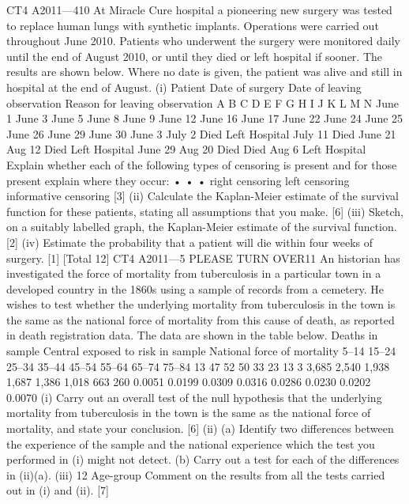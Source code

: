 \documentclass[a4paper,12pt]{article}
\begin{document}
\begin{enumerate}
CT4 A2011—410
At Miracle Cure hospital a pioneering new surgery was tested to replace human lungs
with synthetic implants. Operations were carried out throughout June 2010. Patients
who underwent the surgery were monitored daily until the end of August 2010, or
until they died or left hospital if sooner. The results are shown below. Where no date
is given, the patient was alive and still in hospital at the end of August.
(i)
Patient Date of surgery Date of leaving
observation Reason for
leaving
observation
A
B
C
D
E
F
G
H
I
J
K
L
M
N June 1
June 3
June 5
June 8
June 9
June 12
June 16
June 17
June 22
June 24
June 25
June 26
June 29
June 30 June 3
July 2 Died
Left Hospital
July 11 Died
June 21
Aug 12 Died
Left Hospital
June 29
Aug 20 Died
Died
Aug 6 Left Hospital
Explain whether each of the following types of censoring is present and for
those present explain where they occur:
•
•
•
right censoring
left censoring
informative censoring
[3]
(ii)
Calculate the Kaplan-Meier estimate of the survival function for these
patients, stating all assumptions that you make.
[6]
(iii) Sketch, on a suitably labelled graph, the Kaplan-Meier estimate of the survival
function.
[2]
(iv) Estimate the probability that a patient will die within four weeks of surgery.
[1]
[Total 12]
CT4 A2011—5
PLEASE TURN OVER11
An historian has investigated the force of mortality from tuberculosis in a particular
town in a developed country in the 1860s using a sample of records from a cemetery.
He wishes to test whether the underlying mortality from tuberculosis in the town is
the same as the national force of mortality from this cause of death, as reported in
death registration data. The data are shown in the table below.
Deaths in
sample Central exposed to
risk in sample National force
of mortality
5–14
15–24
25–34
35–44
45–54
55–64
65–74
75–84 13
47
52
50
33
23
13
3 3,685
2,540
1,938
1,687
1,386
1,018
663
260 0.0051
0.0199
0.0309
0.0316
0.0286
0.0230
0.0202
0.0070
(i) Carry out an overall test of the null hypothesis that the underlying mortality
from tuberculosis in the town is the same as the national force of mortality,
and state your conclusion.
[6]
(ii) (a)
Identify two differences between the experience of the sample
and the national experience which the test you performed in (i)
might not detect.
(b)
Carry out a test for each of the differences in (ii)(a).
(iii)
12
Age-group
Comment on the results from all the tests carried out in (i) and (ii).
[7]

\end{enumerate}
\end{document}
